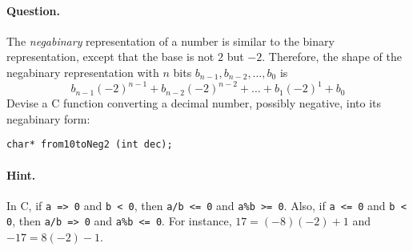 \paragraph{Question.} The \emph{negabinary} representation of a number
is similar to the binary representation, except that the base is not
\(2\) but \(-2\). Therefore, the shape of the negabinary
representation with \(n\) bits \(b_{n-1}, b_{n-2}, \dots, b_0\) is
\[
b_{n-1}(-2)^{n-1} + b_{n-2}(-2)^{n-2} + \dots + b_1(-2)^1 + b_0
\]
Devise a \textsf{C} function converting a decimal number, possibly
negative, into its negabinary form: 
{\small
\begin{verbatim}
char* from10toNeg2 (int dec);
\end{verbatim}
}

\paragraph{Hint.} In \textsf{C}, if \texttt{a => 0} and \texttt{b < 0},
then \texttt{a/b <= 0} and \texttt{a\%b >= 0}. Also, if \texttt{a <=
0} and \texttt{b < 0}, then \texttt{a/b => 0} and \texttt{a\%b <=
0}. For instance, \(17 = (-8)(-2) + 1\) and \(-17 = 8(-2) - 1\).

